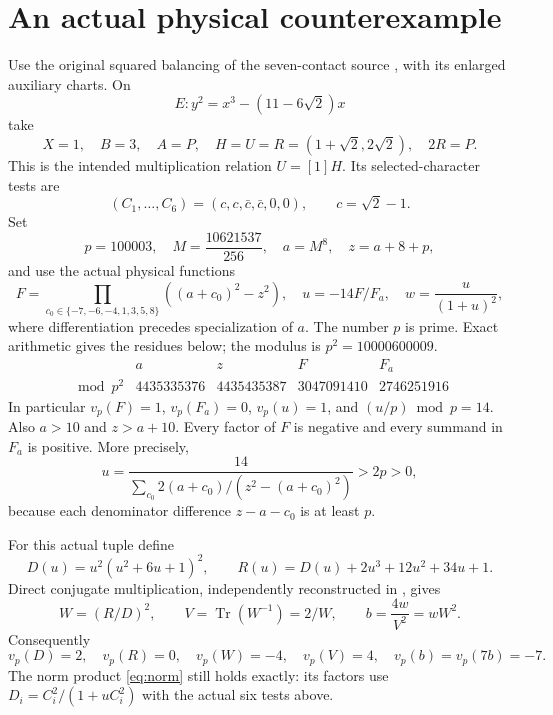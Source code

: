 \documentclass[11pt,a4paper]{article}
\newcommand{\Tr}{\operatorname{Tr}}\newcommand{\Nm}{\operatorname{N}}
\begin{document}
\section{An actual physical counterexample}
Use the original squared balancing of the seven-contact source
\cite{Seven}, with its enlarged auxiliary charts. On
\[
 E:y^2=x^3-(11-6\sqrt2)x
\]
take
\[
 X=1,\quad B=3,\quad A=P,\quad H=U=R=(1+\sqrt2,2\sqrt2),
 \quad 2R=P.
\]
This is the intended multiplication relation $U=[1]H$.
Its selected-character tests are
\[
 (C_1,\ldots,C_6)=(c,c,\bar c,\bar c,0,0),\qquad c=\sqrt2-1.
\]
Set
\begin{equation}\label{eq:fixture}
 p=100003,\quad M=\frac{10621537}{256},\quad a=M^8,
 \quad z=a+8+p,
\end{equation}
and use the actual physical functions
\[
 F=\prod_{c_0\in\{-7,-6,-4,1,3,5,8\}}((a+c_0)^2-z^2),
 \quad u=-14F/F_a,\quad w=\frac{u}{(1+u)^2},
\]
where differentiation precedes specialization of $a$.
The number $p$ is prime. Exact arithmetic gives the residues below;
the modulus is $p^2=10000600009$.
\[
\begin{array}{c|rrrr}
 &a&z&F&F_a\\\hline
 \bmod p^2&4435335376&4435435387&3047091410&2746251916
\end{array}
\]
In particular $v_p(F)=1$, $v_p(F_a)=0$, $v_p(u)=1$, and
$(u/p)\bmod p=14$. Also $a>10$ and $z>a+10$.
Every factor of $F$ is negative and every summand in $F_a$ is
positive. More precisely,
\[
 u=\frac{14}{\sum_{c_0}2(a+c_0)/(z^2-(a+c_0)^2)}>2p>0,
\]
because each denominator difference $z-a-c_0$ is at least $p$.

For this actual tuple define
\[
 D(u)=u^2(u^2+6u+1)^2,\qquad
 R(u)=D(u)+2u^3+12u^2+34u+1.
\]
Direct conjugate multiplication, independently reconstructed in
\cite{Seven}, gives
\[
 W=(R/D)^2,\qquad V=\Tr(W^{-1})=2/W,\qquad
                       b=\frac{4w}{V^2}=wW^2.
\]
Consequently
\begin{equation}\label{eq:bad}
 v_p(D)=2,\quad v_p(R)=0,\quad v_p(W)=-4,
 \quad v_p(V)=4,\quad v_p(b)=v_p(7b)=-7.
\end{equation}
The norm product \eqref{eq:norm} still holds exactly: its factors use
$D_i=C_i^2/(1+uC_i^2)$ with the actual six tests above.
\end{document}
